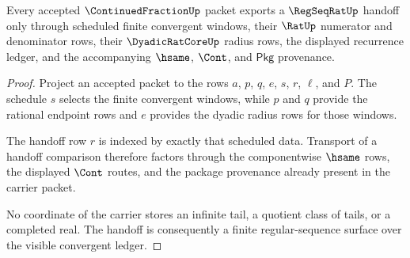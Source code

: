 \begin{theorem}
\label{thm:continuedfraction-regseqrat-handoff}
Every accepted $\ContinuedFractionUp$ packet exports a $\RegSeqRatUp$ handoff
only through scheduled finite convergent windows, their $\RatUp$ numerator and
denominator rows, their $\DyadicRatCoreUp$ radius rows, the displayed
recurrence ledger, and the accompanying $\hsame$, $\Cont$, and $\mathsf{Pkg}$
provenance.
\end{theorem}
\begin{proof}
Project an accepted packet to the rows $a$, $p$, $q$, $e$, $s$, $r$, $\ell$,
and $P$. The schedule $s$ selects the finite convergent windows, while $p$ and
$q$ provide the rational endpoint rows and $e$ provides the dyadic radius rows
for those windows.

The handoff row $r$ is indexed by exactly that scheduled data. Transport of a
handoff comparison therefore factors through the componentwise $\hsame$ rows,
the displayed $\Cont$ routes, and the package provenance already present in
the carrier packet.

No coordinate of the carrier stores an infinite tail, a quotient class of
tails, or a completed real. The handoff is consequently a finite
regular-sequence surface over the visible convergent ledger.
\end{proof}

